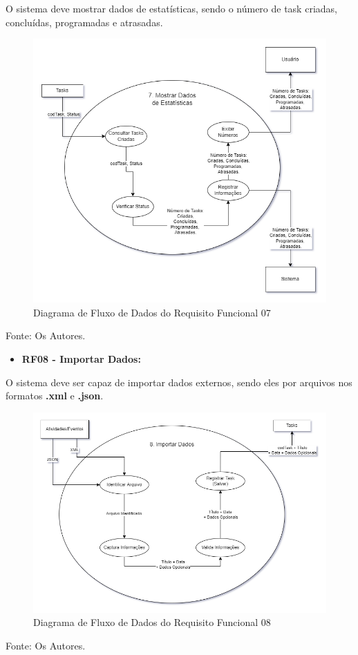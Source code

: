 \documentclass[a4paper,12pt]{article}
\begin{document}
O sistema deve mostrar dados de estatísticas, sendo o número de task criadas, concluídas, programadas e atrasadas.
\begin{figure}[H]
	\centering
	\includegraphics[scale=0.45]{DFDs/RF07.drawio.png}
	\caption{Diagrama de Fluxo de Dados do Requisito Funcional 07}
\end{figure}
\noindent Fonte: Os Autores.

\pagebreak
\begin{itemize}
\item\textbf{RF08 - Importar Dados:}
\end{itemize}

O sistema deve ser capaz de importar dados externos, sendo eles por arquivos nos formatos \textbf{.xml} e \textbf{.json}.
\begin{figure}[H]
	\centering
	\includegraphics[scale=0.45]{DFDs/RF08.drawio.png}
	\caption{Diagrama de Fluxo de Dados do Requisito Funcional 08}
\end{figure}
\noindent Fonte: Os Autores.
\end{document}
